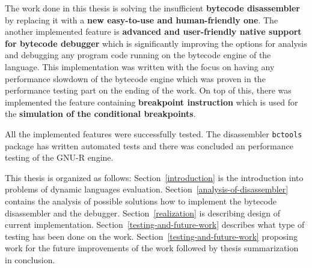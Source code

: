 \documentclass[thesis=M,english]{FITthesis}[2018/10/20]
\newcommand{\code}[1]{\texttt{#1}}
\begin{document}
The work done in this thesis is solving the insufficient \textbf{bytecode disassembler} by replacing it with a \textbf{new easy-to-use and human-friendly one}. The another implemented feature is \textbf{advanced and user-friendly native support for bytecode debugger} which is significantly improving the options for analysis and debugging any program code running on the bytecode engine of the language. This implementation was written with the focus on having any performance slowdown of the bytecode engine which was proven in the performance testing part on the ending of the work. On top of this, there was implemented the feature containing \textbf{breakpoint instruction} which is used for the \textbf{simulation of the conditional breakpoints}.

All the implemented features were successfully tested. The disassembler \code{bctools} package has written automated tests and there was concluded an performance testing of the GNU-R engine. 

This thesis is organized as follows: Section~\ref{introduction} is the introduction into problems of dynamic languages evaluation. Section~\ref{analysis-of-disassembler} contains the analysis of possible solutions how to implement the bytecode disassembler and the debugger. Section~\ref{realization} is describing design of current implementation. Section~\ref{testing-and-future-work} describes what type of testing has been done on the work. Section~\ref{testing-and-future-work} proposing work for the future improvements of the work followed by thesis summarization in conclusion.



\end{document}
